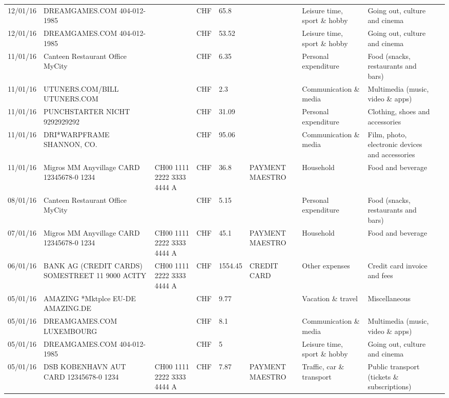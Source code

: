 \begin{landscape}
\begin{tiny}
\begin{longtable}{lp{4cm}llllp{3cm}ll}
		    12/01/16 & DREAMGAMES.COM           404-012-1985 &       & CHF   & 65.8  &       & Leisure time, sport \& hobby & Going out, culture and cinema \\
		    12/01/16 & DREAMGAMES.COM           404-012-1985 &       & CHF   & 53.52 &       & Leisure time, sport \& hobby & Going out, culture and cinema \\
		    11/01/16 & Canteen Restaurant Office      MyCity &       & CHF   & 6.35  &       & Personal expenditure & Food (snacks, restaurants and bars) \\
		    11/01/16 & UTUNERS.COM/BILL          UTUNERS.COM &       & CHF   & 2.3   &       & Communication \& media & Multimedia (music, video \& apps) \\
		    11/01/16 & PUNCHSTARTER NICHT   9292929292 &       & CHF   & 31.09 &       & Personal expenditure & Clothing, shoes and accessories \\
		    11/01/16 & DRI*WARPFRAME             SHANNON, CO. &       & CHF   & 95.06 &       & Communication \& media & Film, photo, electronic devices and accessories \\
		    11/01/16 & Migros MM Anyvillage CARD 12345678-0 1234 & CH00 1111 2222 3333 4444 A & CHF   & 36.8  & PAYMENT MAESTRO & Household & Food and beverage \\
		    08/01/16 & Canteen Restaurant Office      MyCity &       & CHF   & 5.15  &       & Personal expenditure & Food (snacks, restaurants and bars) \\
		    07/01/16 & Migros MM Anyvillage CARD 12345678-0 1234 & CH00 1111 2222 3333 4444 A & CHF   & 45.1  & PAYMENT MAESTRO & Household & Food and beverage \\
		    06/01/16 & BANK AG (CREDIT CARDS) SOMESTREET 11 9000 ACITY & CH00 1111 2222 3333 4444 A & CHF   & 1554.45 & CREDIT CARD & Other expenses & Credit card invoice and fees \\
		    05/01/16 & AMAZING *Mktplce EU-DE    AMAZING.DE &       & CHF   & 9.77  &       & Vacation \& travel & Miscellaneous \\
		    05/01/16 & DREAMGAMES.COM           LUXEMBOURG &       & CHF   & 8.1   &       & Communication \& media & Multimedia (music, video \& apps) \\
		    05/01/16 & DREAMGAMES.COM           404-012-1985 &       & CHF   & 5     &       & Leisure time, sport \& hobby & Going out, culture and cinema \\
		    05/01/16 & DSB KOBENHAVN AUT CARD 12345678-0 1234 & CH00 1111 2222 3333 4444 A & CHF   & 7.87  & PAYMENT MAESTRO & Traffic, car \& transport & Public transport (tickets \& subscriptions) \\

\end{longtable}
\end{tiny}
\end{landscape}
